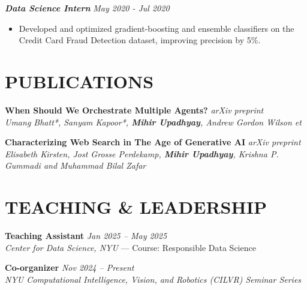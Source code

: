 \documentclass[a4paper,11pt]{article}
\begin{document}
{{\color{lightboldcolor}\textbf{\textit{Data Science Intern}}} \hfill \textit{\small May 2020 - Jul 2020}
\begin{itemize}
    \item Developed and optimized gradient-boosting and ensemble classifiers on the Credit Card Fraud Detection dataset, improving precision by 5\%.
\end{itemize}
\vspace{0.05cm}
\vspace{-0.05cm}
\vspace{-0.2cm}
\section*{PUBLICATIONS}

{\color{boldcolor}\textbf{When Should We Orchestrate Multiple Agents?}} 
\href{https://arxiv.org/pdf/2503.13577}{\fontsize{8}{12}\selectfont\textcolor{darksilver}{\faLink}} \hfill \textit{arXiv preprint} \\
\small \textit{Umang Bhatt*, Sanyam Kapoor*, \textbf{Mihir Upadhyay}, Andrew Gordon Wilson et} \\
\vspace{-0.2cm}

{\color{boldcolor}\textbf{Characterizing Web Search in The Age of Generative AI}} 
\href{https://arxiv.org/pdf/2510.11560v1}{\fontsize{8}{12}\selectfont\textcolor{darksilver}{\faLink}} \hfill \textit{arXiv preprint}\\
\small \textit{Elisabeth Kirsten, Jost Grosse Perdekamp, \textbf{Mihir Upadhyay}, Krishna P. Gummadi and Muhammad Bilal Zafar} \\

\vspace{-0.4cm}
\vspace{-0.2cm}
\section*{TEACHING & LEADERSHIP}

{\color{boldcolor}\textbf{Teaching Assistant}} \hfill \textit{\small Jan 2025 – May 2025}  \\
\textit{Center for Data Science, NYU} — Course: Responsible Data Science \\
\vspace{-0.4cm}

{\color{boldcolor}\textbf{Co-organizer}} \hfill \textit{\small Nov 2024 – Present} \\
\textit{NYU Computational Intelligence, Vision, and Robotics (CILVR) Seminar Series} \\

}
\end{document}
